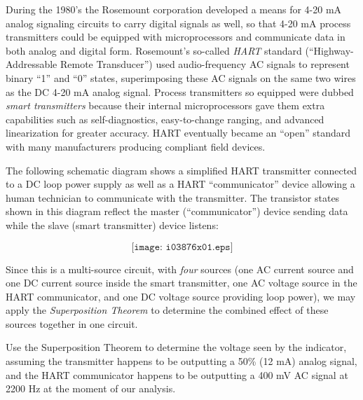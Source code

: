 

During the 1980's the Rosemount corporation developed a means for 4-20 mA analog signaling circuits to carry digital signals as well, so that 4-20 mA process transmitters could be equipped with microprocessors and communicate data in both analog and digital form.  Rosemount's so-called {\it HART} standard (``Highway-Addressable Remote Transducer'') used audio-frequency AC signals to represent binary ``1'' and ``0'' states, superimposing these AC signals on the same two wires as the DC 4-20 mA analog signal.  Process transmitters so equipped were dubbed {\it smart transmitters} because their internal microprocessors gave them extra capabilities such as self-diagnostics, easy-to-change ranging, and advanced linearization for greater accuracy.  HART eventually became an ``open'' standard with many manufacturers producing compliant field devices.

\vskip 10pt

The following schematic diagram shows a simplified HART transmitter connected to a DC loop power supply as well as a HART ``communicator'' device allowing a human technician to communicate with the transmitter.  The transistor states shown in this diagram reflect the master (``communicator'') device sending data while the slave (smart transmitter) device listens:

$$\texttt{[image: i03876x01.eps]}$$

Since this is a multi-source circuit, with {\it four} sources (one AC current source and one DC current source inside the smart transmitter, one AC voltage source in the HART communicator, and one DC voltage source providing loop power), we may apply the {\it Superposition Theorem} to determine the combined effect of these sources together in one circuit.

\vskip 10pt

Use the Superposition Theorem to determine the voltage seen by the indicator, assuming the transmitter happens to be outputting a 50\% (12 mA) analog signal, and the HART communicator happens to be outputting a 400 mV AC signal at 2200 Hz at the moment of our analysis.






